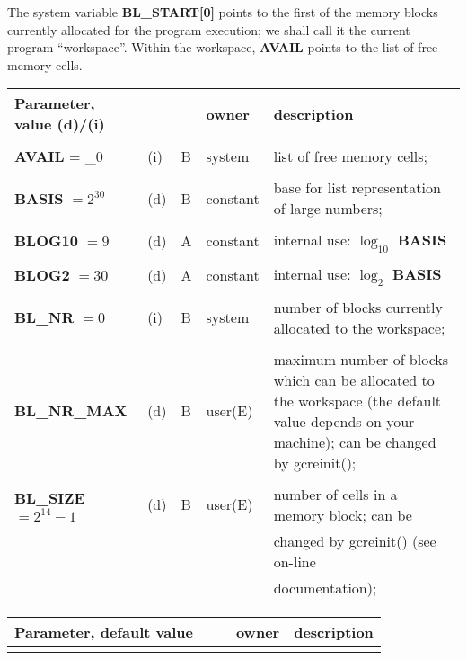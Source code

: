 The system variable {\bf BL\_START[0]} points to the first of the memory blocks cur\-rent\-ly
allocated for the program execution; we shall call it the current program ``workspace''.
Within the workspace, {\bf AVAIL} points to the list of free memory cells.
\leer
\leer
{\small{
\begin{tabular}{p{1.65in}p{0.2in}|p{0.15in}|p{0.54in}|p{2.60in}} 
{Parameter, value (d)/(i)} &     &      & owner         & description \\ \hline  
                           &     &      &               & \\
{\bf AVAIL} = \_0    & (i) & B  & system        & list of free memory cells;\\
                           &     &      &               & \\ 
{\bf BASIS} $=2^{30}$      & (d) & B    & constant      & base for list representation of large \newline numbers;\\
                           &     &      &               & \\ 
{\bf BLOG10} $=9$          & (d) & A    & constant      & internal use: $\log_{10}$ {\bf BASIS}\\
                           &     &              &               & \\ 
{\bf BLOG2} $=30$          & (d) & A    & constant      & internal use: $\log_2$ {\bf BASIS}\\
                           &     &              &               & \\ 
{\bf BL\_NR} $=0$          & (i) & B    & system        & number of blocks currently allocated to the workspace;\\
                           &     &      &               & \\ 
{\bf BL\_NR\_MAX}          & (d) & B    & user(E)       & maximum number of blocks which can be allocated to the
                                                          workspace (the default value depends on your machine);
can be changed by gcreinit();\\
                           &     &              &               & \\ 
{\bf BL\_SIZE} $=2^{14}-1$ & (d) & B    & user(E)       & number of cells in a memory block; can be \\
                           &     &      &               & changed by gcreinit() (see on-line \\
                           &     &      &               & documentation);
\end{tabular}
\newpage
\begin{tabular}{p{1.65in}p{0.2in}|p{0.15in}|p{0.54in}|p{2.60in}} 
{Parameter, default value} &     &      & owner         & description \\ \hline  
                           &     &      &               & \\ 


\end{tabular}}}

